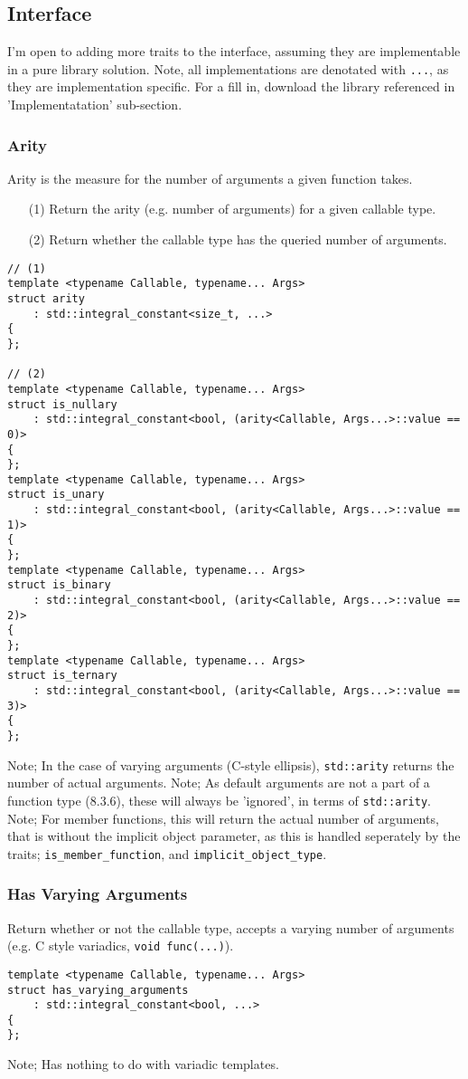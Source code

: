 \subsection{Interface}
I'm open to adding more traits to the interface, assuming they are implementable
in a pure library solution.
\newline
Note, all implementations are denotated with \verb|...|, as they are
implementation specific. For a fill in, download the library referenced in
'Implementatation' sub-section.
\subsubsection{Arity}
Arity is the measure for the number of arguments a given function takes.
\begin{itemize}
\item[(1)] Return the arity (e.g. number of arguments) for a given callable type.
\item[(2)] Return whether the callable type has the queried number of arguments.
\end{itemize}
\begin{verbatim}
// (1)
template <typename Callable, typename... Args>
struct arity
    : std::integral_constant<size_t, ...>
{
};

// (2)
template <typename Callable, typename... Args>
struct is_nullary
    : std::integral_constant<bool, (arity<Callable, Args...>::value == 0)>
{
};
template <typename Callable, typename... Args>
struct is_unary
    : std::integral_constant<bool, (arity<Callable, Args...>::value == 1)>
{
};
template <typename Callable, typename... Args>
struct is_binary
    : std::integral_constant<bool, (arity<Callable, Args...>::value == 2)>
{
};
template <typename Callable, typename... Args>
struct is_ternary
    : std::integral_constant<bool, (arity<Callable, Args...>::value == 3)>
{
};
\end{verbatim}
Note; In the case of varying arguments (C-style ellipsis), \verb|std::arity| returns the
number of actual arguments.
\newline
Note; As default arguments are not a part of a function type (8.3.6), these will
always be 'ignored', in terms of \verb|std::arity|.
\newline
Note; For member functions, this will return the actual number of arguments, 
that is without the implicit object parameter, as this is handled seperately by
the traits; \verb|is_member_function|, and \verb|implicit_object_type|.

\subsubsection{Has Varying Arguments}
Return whether or not the callable type, accepts a varying number of arguments
(e.g. C style variadics, \verb|void func(...)|).
\begin{verbatim}
template <typename Callable, typename... Args>
struct has_varying_arguments
    : std::integral_constant<bool, ...>
{
};
\end{verbatim}
Note; Has nothing to do with variadic templates.

